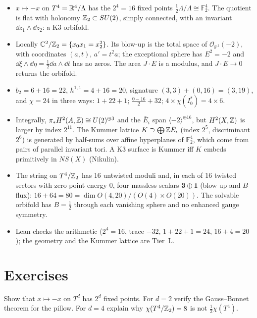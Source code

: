 \begin{summarybox}
\begin{itemize}[leftmargin=*,itemsep=2pt]
\item $x\mapsto-x$ on $T^4=\mathbb{R}^4/\Lambda$ has the $2^4=16$ fixed points
$\frac12\Lambda/\Lambda\cong\mathbb{F}_2^4$. The quotient is flat with holonomy
$\mathbb{Z}_2\subset SU(2)$, simply connected, with an invariant $\dd z_1\wedge\dd z_2$: a K3 orbifold.
\item Locally $\mathbb{C}^2/\mathbb{Z}_2=\{x_0x_1=x_2^2\}$. Its blow-up is the total space of
$\mathcal{O}_{\mathbb{P}^1}(-2)$, with coordinates $(a,t)$, $a'=t^2a$; the exceptional sphere
has $E^2=-2$ and $\dd\xi\wedge\dd\eta=\frac12\dd a\wedge\dd t$ has no zeros. The area
$J\cdot E$ is a modulus, and $J\cdot E\to0$ returns the orbifold.
\item $b_2=6+16=22$, $h^{1,1}=4+16=20$, signature $(3,3)+(0,16)=(3,19)$, and $\chi=24$ in three
ways: $1+22+1$; $\frac{0-16}2+32$; $4\times\chi(I_0^*)=4\times6$.
\item Integrally, $\pi_*H^2(A,\mathbb{Z})\cong U(2)^{\oplus3}$ and the $\bar E_i$ span
$\langle-2\rangle^{\oplus16}$, but $H^2(X,\mathbb{Z})$ is larger by index $2^{11}$. The Kummer lattice
$K\supset\bigoplus\mathbb{Z}\bar E_i$ (index $2^5$, discriminant $2^6$) is generated by half-sums over
affine hyperplanes of $\mathbb{F}_2^4$, which come from pairs of parallel invariant tori. A K3
surface is Kummer iff $K$ embeds primitively in $NS(X)$ (Nikulin).
\item The string on $T^4/\mathbb{Z}_2$ has $16$ untwisted moduli and, in each of $16$ twisted sectors
with zero-point energy $0$, four massless scalars $\mathbf3\oplus\mathbf1$ (blow-up and
$B$-flux): $16+64=80=\dim O(4,20)/(O(4)\times O(20))$. The solvable orbifold has
$B=\frac12$ through each vanishing sphere and no enhanced gauge symmetry.
\item Lean checks the arithmetic ($2^4=16$, trace $-32$, $1+22+1=24$, $16+4=20$); the
geometry and the Kummer lattice are Tier~L.
\end{itemize}
\end{summarybox}

\section*{Exercises}

\begin{exercise}\label{exr:kummer:fixed}
Show that $x\mapsto-x$ on $T^d$ has $2^d$ fixed points. For $d=2$ verify the Gauss--Bonnet
theorem for the pillow. For $d=4$ explain why $\chi(T^4/\mathbb{Z}_2)=8$ is not $\frac12\chi(T^4)$.
\end{exercise}

